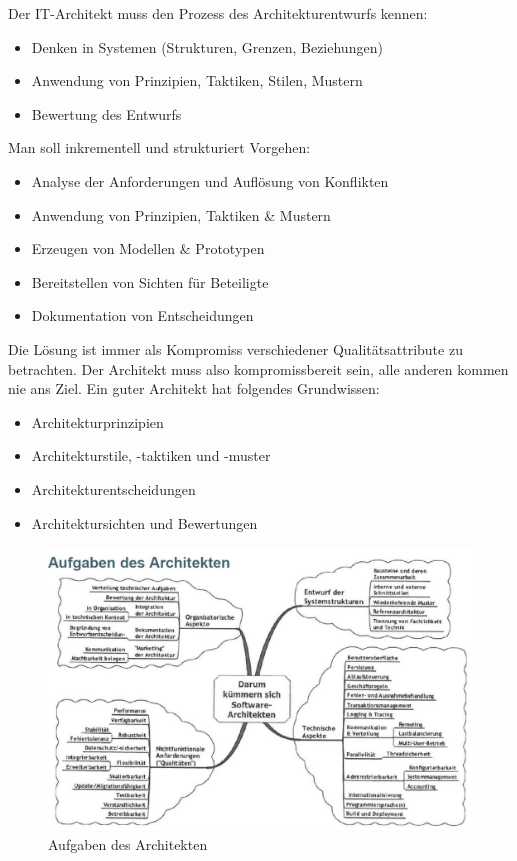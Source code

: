 Der IT-Architekt muss den Prozess des Architekturentwurfs kennen:

\begin{itemize}
	\item Denken in Systemen (Strukturen, Grenzen, Beziehungen)
	\item Anwendung von Prinzipien, Taktiken, Stilen, Mustern
	\item Bewertung des Entwurfs
\end{itemize}

Man soll inkrementell und strukturiert Vorgehen:

\begin{itemize}
	\item Analyse der Anforderungen und Auflösung von Konflikten
	\item Anwendung von Prinzipien, Taktiken \& Mustern
	\item Erzeugen von Modellen \& Prototypen
	\item Bereitstellen von Sichten für Beteiligte
	\item Dokumentation von Entscheidungen
\end{itemize}

Die Lösung ist immer als Kompromiss verschiedener Qualitätsattribute zu betrachten. Der Architekt muss also kompromissbereit sein, alle anderen kommen nie ans Ziel. Ein guter Architekt hat folgendes Grundwissen:

\begin{itemize}
	\item Architekturprinzipien
	\item Architekturstile, -taktiken und -muster
	\item Architekturentscheidungen
	\item Architektursichten und Bewertungen
\end{itemize}

\begin{figure}[h!]
\centering
\includegraphics[width=0.7\linewidth]{fig/aufgaben-des-architekten}
\caption{Aufgaben des Architekten}
\label{fig:aufgaben-des-architekten}
\end{figure}

